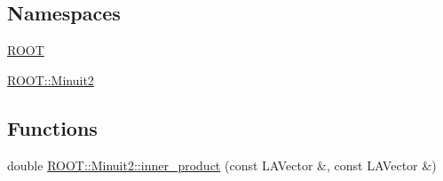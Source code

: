 \subsection*{Namespaces}
\begin{DoxyCompactItemize}
\item 
 \mbox{\hyperlink{namespaceROOT}{R\+O\+OT}}
\item 
 \mbox{\hyperlink{namespaceROOT_1_1Minuit2}{R\+O\+O\+T\+::\+Minuit2}}
\end{DoxyCompactItemize}
\subsection*{Functions}
\begin{DoxyCompactItemize}
\item 
double \mbox{\hyperlink{namespaceROOT_1_1Minuit2_ac47f2faa5fce723ec08365b174b5035d}{R\+O\+O\+T\+::\+Minuit2\+::inner\+\_\+product}} (const L\+A\+Vector \&, const L\+A\+Vector \&)
\end{DoxyCompactItemize}
